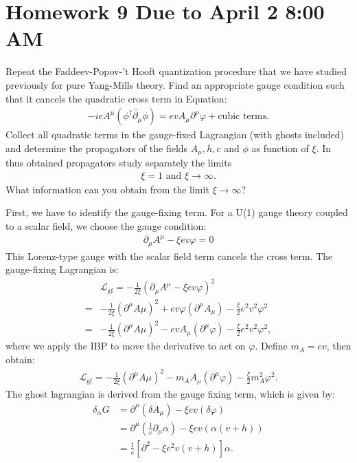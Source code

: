 \section*{Homework 9 Due to April 2 8:00 AM}
Repeat the Faddeev-Popov-’t Hooft quantization procedure that we have studied previously for pure Yang-Mills theory. Find an appropriate gauge condition such that it cancels the quadratic cross term in Equation: 
\begin{align}
    -ie A^\mu (\phi^\dagger\overleftrightarrow{\partial_\mu}\phi)=evA_\mu\partial^\mu \varphi+\text{cubic terms}. 
\end{align}
Collect all quadratic terms in the gauge-fixed Lagrangian (with ghosts included) and determine the propagators of the fields $A_\mu, h, c$ and $\phi$ as function of $\xi$. In thus obtained propagators study separately the limits 
\begin{align}
    \xi=1 \text{ and } \xi\to\infty.
\end{align}
What information can you obtain from the limit $\xi\to\infty$?

\answer{}
First, we have to identify the gauge-fixing term. For a U(1) gauge theory coupled to a scalar field, 
we choose the gauge condition:
\begin{align}
    \partial_\mu A^\mu - \xi e v \varphi = 0
\end{align}
This Lorenz-type gauge with the scalar field term cancels the cross term. The gauge-fixing Lagrangian is:
\begin{align}
    &\mathcal{L}_{\text{gf}} = -\frac{1}{2\xi}(\partial_\mu A^\mu - \xi e v \varphi)^2\\
    =&-\frac{1}{2\xi}(\partial^\mu A\mu)^2 + ev \varphi (\partial^\mu A_\mu) - \frac{\xi}{2} e^2 v^2 \varphi^2\\
    =&-\frac{1}{2\xi}(\partial^\mu A\mu)^2 - ev A_\mu (\partial^\mu \varphi ) - \frac{\xi}{2} e^2 v^2 \varphi^2,
\end{align}
where we apply the IBP to move the derivative to act on $\varphi$. Define $m_A=ev$, then obtain:
\begin{align}
    \mathcal{L}_{\text{gf}} = -\frac{1}{2\xi}(\partial^\mu A\mu)^2 - m_A A_\mu (\partial^\mu \varphi ) - \frac{\xi}{2} m_A^2 \varphi^2.
\end{align}
The ghost lagrangian is derived from the gauge fixing term, which is given by:
\begin{align}
\delta_\alpha G &= \partial^\mu (\delta A_\mu) - \xi e v (\delta \varphi)\\
&= \partial^\mu \left( \frac{1}{e} \partial_\mu \alpha \right) - \xi e v \left( \alpha (v + h) \right) \\
&= \frac{1}{e} \left[ \partial^2 - \xi e^2 v (v + h) \right] \alpha.
\end{align}

